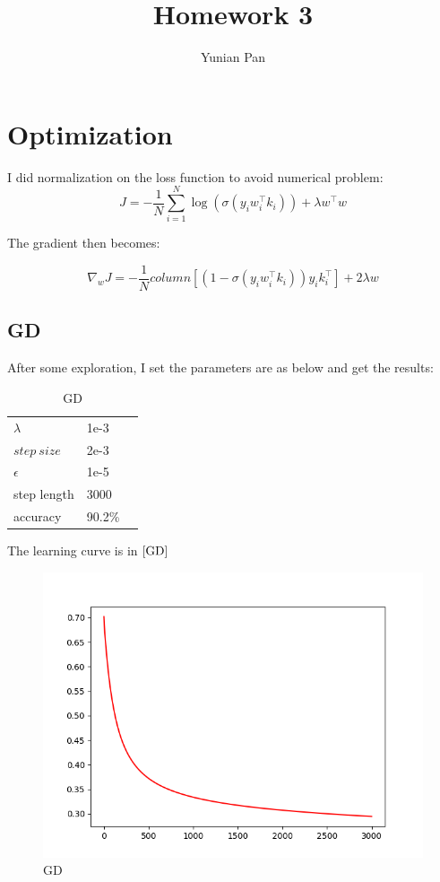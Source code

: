 \documentclass[a4paper,12pt]{article}
\begin{document}
\title{\textbf{Homework 3}}
\author{Yunian Pan}
\maketitle{}


\section{Optimization}

I did normalization on the loss function to avoid numerical problem:
\begin{equation}
   J = -\frac{1}{N}\sum_{i=1}^{N} \log(\sigma(y_i w_i^{\top} k_i)) + \lambda w^{\top} w \nonumber 
\end{equation}

The gradient then becomes:

\begin{equation}
    \nabla_{w}J = -\frac{1}{N}column[(1- \sigma(y_i w_i^{\top} k_i)) y_i k_i^{\top}] + 2  \lambda  w \nonumber 
 \end{equation}


\subsection{GD}

After some exploration, I set the parameters are as below and get the results:

\begin{table}[htbp]
    \caption{GD}
    \label{GD-table}
    \centering
    \begin{tabular}{lll}
      $\lambda$     &  1e-3 \\
      $step\ size$ &   2e-3   \\
      $\epsilon$     &  1e-5     \\
      step length     &   3000 \\
      accuracy & 90.2\% 
    \end{tabular}
  \end{table}

The learning curve is in $\ref{GD}$
  \begin{figure}[htbp]
    \centering
    \includegraphics[width = .8\textwidth]{GD}
    \caption{GD}
    \label{GD}
\end{figure}
\end{document}

